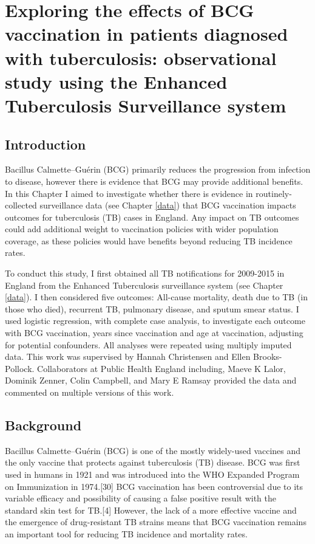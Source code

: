 \documentclass[11pt,twoside]{bristolthesis}
\begin{document}
  \hypertarget{benefical-bcg-out}{%
  \chapter{Exploring the effects of BCG vaccination in patients diagnosed with tuberculosis: observational study using the Enhanced Tuberculosis Surveillance system}\label{benefical-bcg-out}}
  
  \hypertarget{introduction-4}{%
  \section{Introduction}\label{introduction-4}}
  
  Bacillus Calmette--Guérin (BCG) primarily reduces the progression from infection to disease, however there is evidence that BCG may provide additional benefits. In this Chapter I aimed to investigate whether there is evidence in routinely-collected surveillance data (see Chapter \ref{data}) that BCG vaccination impacts outcomes for tuberculosis (TB) cases in England. Any impact on TB outcomes could add additional weight to vaccination policies with wider population coverage, as these policies would have benefits beyond reducing TB incidence rates.
  
  To conduct this study, I first obtained all TB notifications for 2009-2015 in England from the Enhanced Tuberculosis surveillance system (see Chapter \ref{data}). I then considered five outcomes: All-cause mortality, death due to TB (in those who died), recurrent TB, pulmonary disease, and sputum smear status. I used logistic regression, with complete case analysis, to investigate each outcome with BCG vaccination, years since vaccination and age at vaccination, adjusting for potential confounders. All analyses were repeated using multiply imputed data. This work was supervised by Hannah Christensen and Ellen Brooks-Pollock. Collaborators at Public Health England including, Maeve K Lalor, Dominik Zenner, Colin Campbell, and Mary E Ramsay provided the data and commented on multiple versions of this work.
  
  \hypertarget{background-3}{%
  \section{Background}\label{background-3}}
  
  Bacillus Calmette--Guérin (BCG) is one of the mostly widely-used vaccines and the only vaccine that protects against tuberculosis (TB) disease. BCG was first used in humans in 1921 and was introduced into the WHO Expanded Program on Immunization in 1974.{[}30{]} BCG vaccination has been controversial due to its variable efficacy and possibility of causing a false positive result with the standard skin test for TB.{[}4{]} However, the lack of a more effective vaccine and the emergence of drug-resistant TB strains means that BCG vaccination remains an important tool for reducing TB incidence and mortality rates.
  
\end{document}
